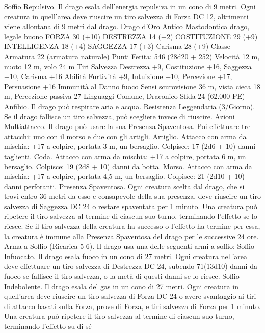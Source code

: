 \begin{multicols}{2}
Soffio Repulsivo. Il drago esala dell’energia repulsiva in un cono di 9
metri. Ogni creatura in quell’area deve riuscire un tiro salvezza di
Forza DC 12, altrimenti viene allontana di 9 metri dal drago.
Drago d’Oro Antico
Mastodontica drago, legale buono
FORZA 30 (+10)
DESTREZZA 14 (+2)
COSTITUZIONE 29 (+9)
INTELLIGENZA 18 (+4)
SAGGEZZA 17 (+3)
Carisma 28 (+9)
Classe Armatura 22 (armatura naturale)
\hspace*{0pt}\hfill{Punti Ferita}: 546 (28d20 + 252)
Velocità 12 m, nuoto 12 m, volo 24 m
Tiri Salvezza Destrezza +9, Costituzione +16, Saggezza +10,
Carisma +16
Abilità Furtività +9, Intuizione +10, Percezione +17, Persuasione +16
Immunità al Danno fuoco
Sensi scurovisione 36 m, vista cieca 18 m, Percezione passiva 27
Linguaggi Comune, Draconico
Sfida 24 (62.000 PE)
Anfibio. Il drago può respirare aria e acqua.
Resistenza Leggendaria (3/Giorno). Se il drago fallisce un tiro
salvezza, può scegliere invece di riuscire.
Azioni
Multiattacco. Il drago può usare la sua Presenza Spaventosa. Poi
effettuare tre attacchi: uno con il morso e due con gli artigli.
Artiglio. Attacco con arma da mischia: +17 a colpire, portata 3
m, un bersaglio.
Colpisce: 17 (2d6 + 10) danni taglienti.
Coda. Attacco con arma da mischia: +17 a colpire, portata 6 m,
un bersaglio.
Colpisce: 19 (2d8 + 10) danni da botta.
Morso. Attacco con arma da mischia: +17 a colpire, portata 4,5
m, un bersaglio.
Colpisce: 21 (2d10 + 10) danni perforanti.
Presenza Spaventosa. Ogni creatura scelta dal drago, che si trovi
entro 36 metri da esso e consapevole della sua presenza, deve
riuscire un tiro salvezza di Saggezza DC 24 o restare spaventata per
1 minuto. Una creatura può ripetere il tiro salvezza al termine di
ciascun suo turno, terminando l’effetto se lo riesce. Se il tiro salvezza
della creatura ha successo o l’effetto ha termine per essa, la creatura è
immune alla Presenza Spaventosa del drago per le successive 24 ore.
Arma a Soffio (Ricarica 5-6). Il drago usa una delle seguenti armi
a soffio:
Soffio Infuocato. Il drago esala fuoco in un cono di 27 metri. Ogni
creatura nell’area deve effettuare un tiro salvezza di Destrezza DC
24, subendo 71(13d10) danni da fuoco se fallisce il tiro salvezza, o la
metà di questi danni se lo riesce.
Soffio Indebolente. Il drago esala del gas in un cono di 27 metri. Ogni
creatura in quell’area deve riuscire un tiro salvezza di Forza DC 24 o
avere svantaggio ai tiri di attacco basati sulla Forza, prove di Forza, e
tiri salvezza di Forza per 1 minuto. Una creatura può ripetere il tiro
salvezza al termine di ciascun suo turno, terminando l’effetto su di sé

\end{multicols}
